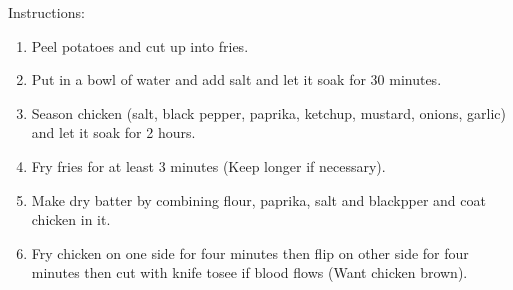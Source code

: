 \documentclass{article}
\begin{document}
Instructions:
\begin{enumerate}
    \item Peel potatoes and cut up into fries.
    \item Put in a bowl of water and add salt and let it soak for 30 minutes.
    \item Season chicken (salt, black pepper, paprika, ketchup, mustard, onions, garlic) and let it soak for 2 hours.
    \item Fry fries for at least 3 minutes (Keep longer if necessary).
    \item Make dry batter by combining flour, paprika, salt and blackpper and coat chicken in it.
    \item Fry chicken on one side for four minutes then flip on other side for four minutes then cut with knife tosee if blood flows (Want chicken brown).

\end{enumerate}
\end{document}
